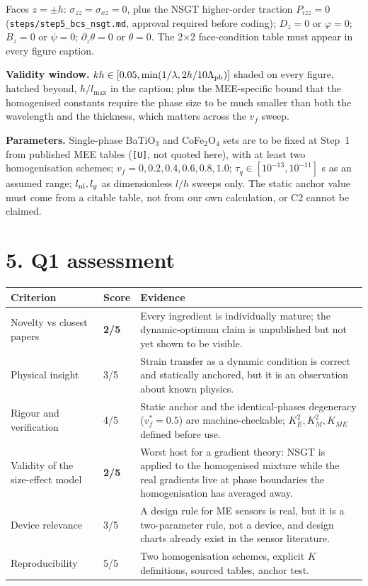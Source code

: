 \documentclass[11pt]{article}
\begin{document}
Faces $z=\pm h$: $\sigma_{zz}=\sigma_{xz}=0$, plus the NSGT higher-order traction $P_{izz}=0$
(\texttt{steps/step5\_bcs\_nsgt.md}, approval required before coding); $D_z=0$ or $\varphi=0$;
$B_z=0$ or $\psi=0$; $\partial_z\theta=0$ or $\theta=0$. The 2$\times$2 face-condition table must
appear in every figure caption.

\textbf{Validity window.} $kh\in[0.05,\min(1/\lambda,2h/10\Lambda_{\rm ph})]$ shaded on every figure,
hatched beyond, $h/l_{\max}$ in the caption; plus the MEE-specific bound that the homogenised
constants require the phase size to be much smaller than both the wavelength and the thickness, which
matters across the $v_f$ sweep.

\textbf{Parameters.} Single-phase BaTiO$_3$ and CoFe$_2$O$_4$ sets are to be fixed at Step~1 from
published MEE tables (\texttt{[U]}, not quoted here), with at least two homogenisation schemes;
$v_f=0,0.2,0.4,0.6,0.8,1.0$; $\tau_q\in[10^{-13},10^{-11}]$ s as an assumed range;
$l_{\rm nl},l_g$ as dimensionless $l/h$ sweeps only. The static anchor value must come from a
citable table, not from our own calculation, or C2 cannot be claimed.

\section*{5. Q1 assessment}
\begin{table}[h]
\centering\small
\begin{tabular}{p{5.2cm}p{1.2cm}p{8.2cm}}
\hline
Criterion & Score & Evidence \\
\hline
Novelty vs closest papers & \textbf{2/5} & Every ingredient is individually mature; the dynamic-optimum claim is unpublished but not yet shown to be visible. \\
Physical insight & 3/5 & Strain transfer as a dynamic condition is correct and statically anchored, but it is an observation about known physics. \\
Rigour and verification & 4/5 & Static anchor and the identical-phases degeneracy ($v_f^{*}=0.5$) are machine-checkable; $K_E^2,K_M^2,K_{ME}$ defined before use. \\
Validity of the size-effect model & \textbf{2/5} & Worst host for a gradient theory: NSGT is applied to the homogenised mixture while the real gradients live at phase boundaries the homogenisation has averaged away. \\
Device relevance & 3/5 & A design rule for ME sensors is real, but it is a two-parameter rule, not a device, and design charts already exist in the sensor literature. \\
Reproducibility & 5/5 & Two homogenisation schemes, explicit $K$ definitions, sourced tables, anchor test. \\
\hline
\end{tabular}
\end{table}
\end{document}
